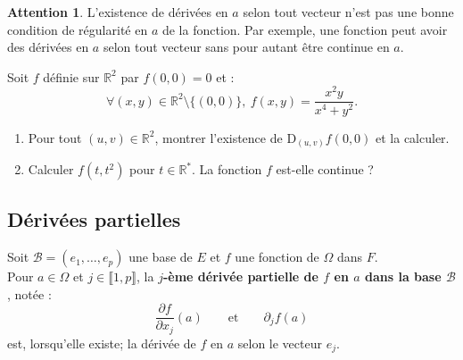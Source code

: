 \documentclass[french]{article}
\newcommand{\R}{\mathbb{R}}
\newcommand{\st}{^*}
\newcommand{\D}{\text{D}}
\theoremstyle{plain}
\theoremstyle{definition}
\newtheorem*{attention}{Attention}
\theoremstyle{remark}
\begin{document}
\begin{attention}
	L'existence de dérivées en $a$ selon tout vecteur n'est pas une bonne condition de régularité en $a$ de la fonction. Par exemple, une fonction peut avoir des dérivées en $a$ selon tout vecteur sans pour autant être continue en $a$.
\end{attention}

\begin{exo}
	Soit $f$ définie sur $\R^2$ par $f(0,0)=0$ et : 
	$$\forall (x,y)\in\R^2\setminus\{(0,0)\},\ f(x,y)=\frac{x^2y}{x^4+y^2}.$$
	\begin{enumerate}
		\item Pour tout $(u,v)\in\R^2$, montrer l'existence de $\D_{(u,v)}f(0,0)$ et la calculer.
		\item Calculer $f(t,t^2)$ pour $t\in\R\st$. La fonction $f$ est-elle continue ?
	\end{enumerate}
\end{exo}

\subsection{Dérivées partielles}

\begin{dfn}
	Soit $\mathcal{B}=(e_1,\ldots,e_p)$ une base de $E$ et $f$ une fonction de $\Omega$ dans $F$.\\
	Pour $a\in\Omega$ et $j\in\llbracket1,p\rrbracket$, la \textbf{$j$-ème dérivée partielle de $f$ en $a$ dans la base $\mathcal{B}$}, notée :
	$$\frac{\partial f}{\partial x_j}(a)\quad\quad\text{et}\quad\quad \partial_jf(a)$$ est, lorsqu'elle existe; la dérivée de $f$ en $a$ selon le vecteur $e_j$.
\end{dfn}
\end{document}
